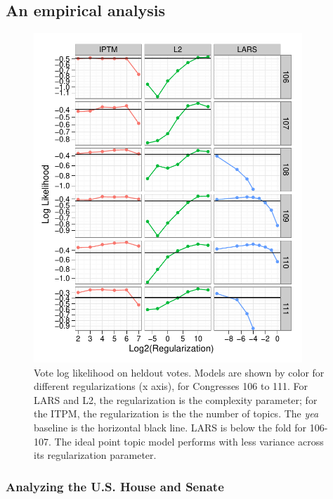 \subsection*{An empirical analysis}

\begin{figure}
\label{fig:log_likelihood}
\begin{center}
  \includegraphics[width=0.9\textwidth]
{chapter_spatial_voting_with_text/figures/138_log_likelihood_by_session_topics.pdf}
\end{center}
\vspace{-6pt}
\caption{Vote log likelihood on heldout votes. Models are shown
  by color for different regularizations (x axis), for Congresses 106
  to 111.  For LARS and L2, the regularization is the complexity
  parameter; for the ITPM, the regularization is the the number of
  topics.  The \emph{yea} baseline is the horizontal black line. LARS
  is below the fold for 106-107.  The ideal point topic model performs
  with less variance across its regularization parameter. }
\vspace{-3pt}
\end{figure}
\subsubsection*{Analyzing the U.S. House and Senate}
\label{sec:experiments}

